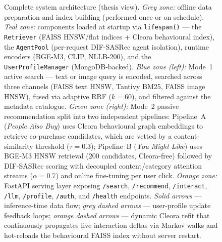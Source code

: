 \begin{figure}[htbp]
{{%
}%
}%
\caption{Complete system architecture (thesis view).
  \emph{Grey zone:} offline data preparation and index building (performed once or on
  schedule).
  \emph{Teal zone:} components loaded at startup via \texttt{lifespan()}
  — the \texttt{Retriever} (FAISS HNSW/flat indices + Cleora behavioural index),
  the \texttt{AgentPool} (per-request DIF-SASRec agent isolation), runtime encoders
  (BGE-M3, CLIP, NLLB-200), and the \texttt{UserProfileManager} (MongoDB-backed).
  \emph{Blue zone (left):} Mode~1 active search — text or image query is encoded,
  searched across three channels (FAISS text HNSW, Tantivy BM25, FAISS image HNSW),
  fused via adaptive RRF ($k{=}60$), and filtered against the metadata catalogue.
  \emph{Green zone (right):} Mode~2 passive recommendation split into two independent
  pipelines:
  Pipeline~A (\emph{People Also Buy}) uses Cleora behavioural graph embeddings to
  retrieve co-purchase candidates, which are vetted by a content-similarity threshold
  ($\tau{=}0.3$);
  Pipeline~B (\emph{You Might Like}) uses BGE-M3 HNSW retrieval (200 candidates,
  Cleora-free) followed by DIF-SASRec scoring with decoupled content/category
  attention streams ($\alpha{=}0.7$) and online fine-tuning per user click.
  \emph{Orange zone:} FastAPI serving layer exposing \texttt{/search},
  \texttt{/recommend}, \texttt{/interact}, \texttt{/llm}, \texttt{/profile},
  \texttt{/auth}, and \texttt{/health} endpoints.
  \emph{Solid arrows} — inference-time data flow;
  \emph{grey dashed arrows} — user-profile update feedback loops;
  \emph{orange dashed arrows} — dynamic Cleora refit that continuously
  propagates live interaction deltas via Markov walks and hot-reloads
  the behavioural FAISS index without server restart.}
\label{fig:arch}
\end{figure}
